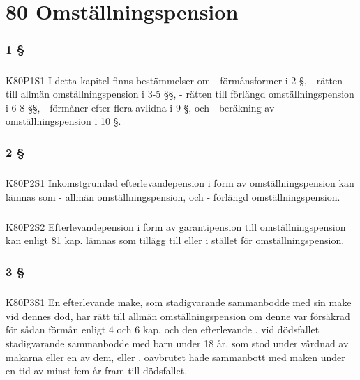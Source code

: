 \documentclass[a4paper,notitlepage,openany,10pt]{book}
\begin{document}
\chapter*{80 Omställningspension}
\subsection*{1 §}
\paragraph*{}
{\tiny K80P1S1}
I detta kapitel finns bestämmelser om
\newline - förmånsformer i 2 §,
\newline - rätten till allmän omställningspension i 3-5 §§,
\newline - rätten till förlängd omställningspension i 6-8 §§,
\newline - förmåner efter flera avlidna i 9 §, och
\newline - beräkning av omställningspension i 10 §.
\subsection*{2 §}
\paragraph*{}
{\tiny K80P2S1}
Inkomstgrundad efterlevandepension i form av omställningspension kan lämnas som
\newline - allmän omställningspension, och
\newline - förlängd omställningspension.
\paragraph*{}
{\tiny K80P2S2}
Efterlevandepension i form av garantipension till omställningspension kan enligt 81 kap. lämnas som tillägg till eller i stället för omställningspension.
\subsection*{3 §}
\paragraph*{}
{\tiny K80P3S1}
En efterlevande make, som stadigvarande sammanbodde med sin make vid dennes död, har rätt till allmän omställningspension om denne var försäkrad för sådan förmån enligt 4 och 6 kap. och den efterlevande
. vid dödsfallet stadigvarande sammanbodde med barn under 18 år, som stod under vårdnad av makarna eller en av dem, eller
. oavbrutet hade sammanbott med maken under en tid av minst fem år fram till dödsfallet.
\end{document}
